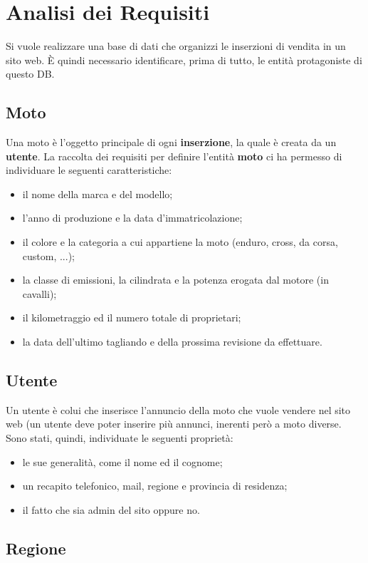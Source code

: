 \section{Analisi dei Requisiti}
	Si vuole realizzare una base di dati che organizzi le inserzioni di vendita in un sito web. \`{E} quindi necessario identificare, prima di tutto, le entit\`{a} protagoniste di questo DB.
	
	\subsection{Moto}	
		Una moto \`{e} l'oggetto principale di ogni \textbf{inserzione}, la quale \`{e} creata da un \textbf{utente}. La raccolta dei requisiti per definire l'entit\`{a} \textbf{moto} ci ha permesso di individuare le seguenti caratteristiche:
	\begin{itemize}
	\openup -0.5em
		\item il nome della marca e del modello;
		\item l'anno di produzione e la data d'immatricolazione;
 		\item il colore e la categoria a cui appartiene la moto (enduro, cross, da corsa, custom, ...);
  		\item la classe di emissioni, la cilindrata e la potenza erogata dal motore (in cavalli);
  		\item il kilometraggio ed il numero totale di proprietari;
  		\item la data dell'ultimo tagliando e della prossima revisione da effettuare.
	\end{itemize}
	
  	\subsection{Utente}
  	Un utente \`{e} colui che inserisce l'annuncio della moto che vuole vendere nel sito web (un utente deve poter inserire pi\`{u} annunci, inerenti per\`{o} a moto diverse. Sono stati, quindi, individuate le seguenti propriet\`{a}:
  	\begin{itemize}
  	\openup -0.5em
  		\item le sue generalit\`{a}, come il nome ed il cognome; 
  		\item un recapito telefonico, mail, regione e provincia di residenza;
  		\item il fatto che sia admin del sito oppure no.
  	\end{itemize}
  	
  	\subsection{Regione}
  	
  	
  		
